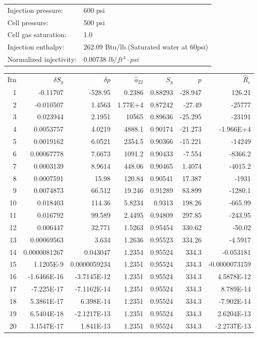 \documentclass[11pt]{article}
\begin{document}
\begin{tabular}{ l l }
    Injection pressure: & 600 psi \\
    Cell pressure: & 500 psi \\
    Cell gas saturation: & 1.0 \\
    Injection enthalpy: & 262.09 Btu/lb.(Saturated water at 60psi) \\
    Normalized injectivity: & 0.00738 $lb/ft^3\cdot psi$\\
\end{tabular}
\vspace{20pt}

\begin{table}[H]
\centering
\begin{tabular}{ r r r r r r r }
    Itn & $\delta S_g$ & $\delta p$ & $\hat{a}_{22}$ &
    $S_g$ & $p$ & $\hat{R}_e$ \\
    1 & -0.11707 & -528.95 & 0.2386 & 0.88293 & -28.947 & 126.21 \\
    2 & -0.010507 & 1.4563 & 1.77E+4 & 0.87242 & -27.49 & -25777 \\
    3 & 0.023944 & 2.1951 & 10565 & 0.89636 & -25.295 & -23191 \\
    4 & 0.0053757 & 4.0219 & 4888.1 & 0.90174 & -21.273 & -1.966E+4 \\
    5 & 0.0019162 & 6.0521 & 2354.5 & 0.90366 & -15.221 & -14249 \\
    6 & 0.00067778 & 7.6673 & 1091.2 & 0.90433 & -7.554 & -8366.2 \\
    7 & 0.0003139 & 8.9614 & 448.06 & 0.90465 & 1.4074 & -4015.2 \\
    8 & 0.0007591 & 15.98 & 120.84 & 0.90541 & 17.387 & -1931 \\
    9 & 0.0074873 & 66.512 & 19.246 & 0.91289 & 83.899 & -1280.1 \\
    10 & 0.018403 & 114.36 & 5.8234 & 0.9313 & 198.26 & -665.99 \\
    11 & 0.016792 & 99.589 & 2.4495 & 0.94809 & 297.85 & -243.95 \\
    12 & 0.006447 & 32.771 & 1.5263 & 0.95454 & 330.62 & -50.02 \\
    13 & 0.00069563 & 3.634 & 1.2636 & 0.95523 & 334.26 & -4.5917 \\
    14 & 0.0000081267 & 0.043047 & 1.2354 & 0.95524 & 334.3 & -0.053181 \\
    15 & 1.1205E-9 & 0.0000059234 & 1.2351 & 0.95524 & 334.3 & -0.0000073159 \\
    16 & -1.6466E-16 & -3.7145E-12 & 1.2351 & 0.95524 & 334.3 & 4.5878E-12 \\
    17 & -7.225E-17 & -7.1162E-14 & 1.2351 & 0.95524 & 334.3 & 8.789E-14 \\
    18 & 5.3861E-17 & 6.398E-14 & 1.2351 & 0.95524 & 334.3 & -7.902E-14 \\
    19 & 6.5404E-18 & -2.1217E-13 & 1.2351 & 0.95524 & 334.3 & 2.6204E-13 \\
    20 & 3.1547E-17 & 1.841E-13 & 1.2351 & 0.95524 & 334.3 & -2.2737E-13 \\
\end{tabular}
\end{table}
\end{document}
